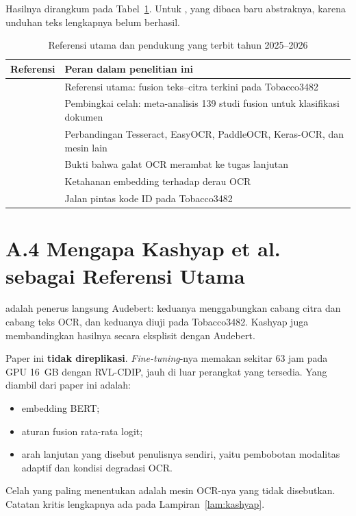 Hasilnya dirangkum pada Tabel~\ref{tab:referensi-baru}. Untuk \textcite{larson2025}, yang
dibaca baru abstraknya, karena unduhan teks lengkapnya belum berhasil.

\begin{table}[H]
  \centering
  \caption{Referensi utama dan pendukung yang terbit tahun 2025--2026}
  \label{tab:referensi-baru}
  \fontsize{10}{12}\selectfont
  \begin{tabularx}{\textwidth}{|l|>{\raggedright\arraybackslash}X|}
    \hline
    \textbf{Referensi} & \textbf{Peran dalam penelitian ini} \\ \hline
    \textcite{kashyap2026} & Referensi utama: fusion teks--citra terkini pada
    Tobacco3482 \\ \hline
    \textcite{mironczuk2026} & Pembingkai celah: meta-analisis 139 studi fusion untuk
    klasifikasi dokumen \\ \hline
    \textcite{francis2025} & Perbandingan Tesseract, EasyOCR, PaddleOCR, Keras-OCR, dan
    mesin lain \\ \hline
    \textcite{zhang2025} & Bukti bahwa galat OCR merambat ke tugas lanjutan \\ \hline
    \textcite{michail2025} & Ketahanan embedding terhadap derau OCR \\ \hline
    \textcite{larson2025} & Jalan pintas kode ID pada Tobacco3482 \\ \hline
  \end{tabularx}
\end{table}

\section*{A.4 Mengapa Kashyap et al. sebagai Referensi Utama}

\textcite{kashyap2026} adalah penerus langsung Audebert: keduanya menggabungkan cabang
citra dan cabang teks OCR, dan keduanya diuji pada Tobacco3482. Kashyap juga
membandingkan hasilnya secara eksplisit dengan Audebert.

Paper ini \textbf{tidak direplikasi}. \textit{Fine-tuning}-nya memakan sekitar 63 jam
pada GPU 16~GB dengan RVL-CDIP, jauh di luar perangkat yang tersedia. Yang diambil dari
paper ini adalah:
\begin{itemize}
  \item embedding BERT;
  \item aturan fusion rata-rata logit;
  \item arah lanjutan yang disebut penulisnya sendiri, yaitu pembobotan modalitas adaptif
  dan kondisi degradasi OCR.
\end{itemize}
Celah yang paling menentukan adalah mesin OCR-nya yang tidak disebutkan. Catatan kritis
lengkapnya ada pada Lampiran~\ref{lam:kashyap}.

